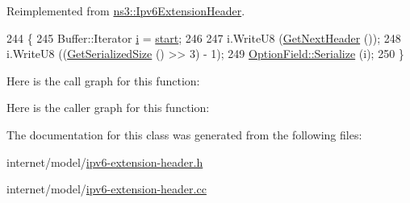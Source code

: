Reimplemented from \hyperlink{classns3_1_1Ipv6ExtensionHeader_a98bce1a4ea1265b45c480eed63dc2893}{ns3\+::\+Ipv6\+Extension\+Header}.


\begin{DoxyCode}
244 \{
245   Buffer::Iterator \hyperlink{bernuolliDistribution_8m_a6f6ccfcf58b31cb6412107d9d5281426}{i} = \hyperlink{namespacevisualizer_1_1core_a2a35e5d8a34af358b508dac8635754e0}{start};
246 
247   i.WriteU8 (\hyperlink{classns3_1_1Ipv6ExtensionHeader_a8bcd0646a2fe4c335270fc1d9d336324}{GetNextHeader} ());
248   i.WriteU8 ((\hyperlink{classns3_1_1Ipv6ExtensionHopByHopHeader_a796967bac361ede79accbdc0e8c41f3f}{GetSerializedSize} () >> 3) - 1);
249   \hyperlink{classns3_1_1OptionField_a9cd4cd7b17a7e443a17dcfcfadef4c28}{OptionField::Serialize} (i);
250 \}
\end{DoxyCode}


Here is the call graph for this function\+:




Here is the caller graph for this function\+:




The documentation for this class was generated from the following files\+:\begin{DoxyCompactItemize}
\item 
internet/model/\hyperlink{ipv6-extension-header_8h}{ipv6-\/extension-\/header.\+h}\item 
internet/model/\hyperlink{ipv6-extension-header_8cc}{ipv6-\/extension-\/header.\+cc}\end{DoxyCompactItemize}
